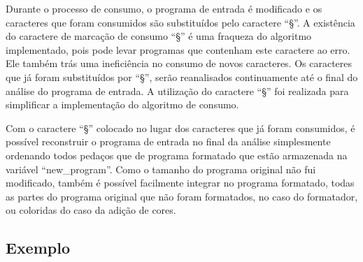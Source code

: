 Durante o processo de consumo,
o programa de entrada é modificado e
os caracteres que foram consumidos são substituídos pelo caractere ``§''.
A existência do caractere de marcação de consumo ``§'' é uma fraqueza do algoritmo implementado,
pois pode levar programas que contenham este caractere ao erro.
Ele também trás uma ineficiência no consumo de novos caracteres.
Os caracteres que já foram substituídos por ``§'',
serão reanalisados continuamente até o final do análise do programa de entrada.
A utilização do caractere ``§'' foi realizada para simplificar a implementação do algoritmo de consumo.

Com o caractere ``§'' colocado no lugar dos caracteres que já foram consumidos,
é possível reconstruir o programa de entrada no final da análise simplesmente ordenando todos pedaços que de programa formatado que estão armazenada na variável ``new\_program''.
Como o tamanho do programa original não fui modificado,
também é possível facilmente integrar no programa formatado,
todas as partes do programa original que não foram formatados,
no caso do formatador,
ou coloridas do caso da adição de cores.


\subsection{Exemplo}

